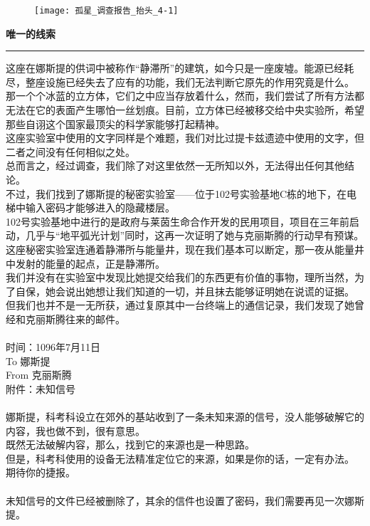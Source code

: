 \documentclass[openany]{book}
\begin{document}
\begin{figure}[h]
    \centering
    \texttt{[image: 孤星\_调查报告\_抬头\_4-1]}
\end{figure}
{\Large\textbf{唯一的线索}}\par\noindent\rule{\textwidth}{0.4pt}
这座在娜斯提的供词中被称作“静滞所”的建筑，如今只是一座废墟。能源已经耗尽，整座设施已经失去了应有的功能，我们无法判断它原先的作用究竟是什么。\\
那一个个冰蓝的立方体，它们之中应当存放着什么，然而，我们尝试了所有方法都无法在它的表面产生哪怕一丝划痕。目前，立方体已经被移交给中央实验所，希望那些自诩这个国家最顶尖的科学家能够打起精神。\\
这座实验室中使用的文字同样是个难题，我们对比过提卡兹遗迹中使用的文字，但二者之间没有任何相似之处。\\
总而言之，经过调查，我们除了对这里依然一无所知以外，无法得出任何其他结论。\\
不过，我们找到了娜斯提的秘密实验室——位于102号实验基地C栋的地下，在电梯中输入密码才能够进入的隐藏楼层。\\
102号实验基地中进行的是政府与莱茵生命合作开发的民用项目，项目在三年前启动，几乎与“地平弧光计划”同时，这再一次证明了她与克丽斯腾的行动早有预谋。\\
这座秘密实验室连通着静滞所与能量井，现在我们基本可以断定，那一夜从能量井中发射的能量的起点，正是静滞所。\\
我们并没有在实验室中发现比她提交给我们的东西更有价值的事物，理所当然，为了自保，她会说出她想让我们知道的一切，并且抹去能够证明她在说谎的证据。\\
但我们也并不是一无所获，通过复原其中一台终端上的通信记录，我们发现了她曾经和克丽斯腾往来的邮件。\\
\\
{
时间：1096年7月11日\\
To 娜斯提\\
From 克丽斯腾\\
附件：未知信号\\
\\
娜斯提，科考科设立在郊外的基站收到了一条未知来源的信号，没人能够破解它的内容，我也做不到，很有意思。\\
既然无法破解内容，那么，找到它的来源也是一种思路。\\
但是，科考科使用的设备无法精准定位它的来源，如果是你的话，一定有办法。\\
期待你的捷报。}\\
\\
未知信号的文件已经被删除了，其余的信件也设置了密码，我们需要再见一次娜斯提。
\clearpage
\end{document}
